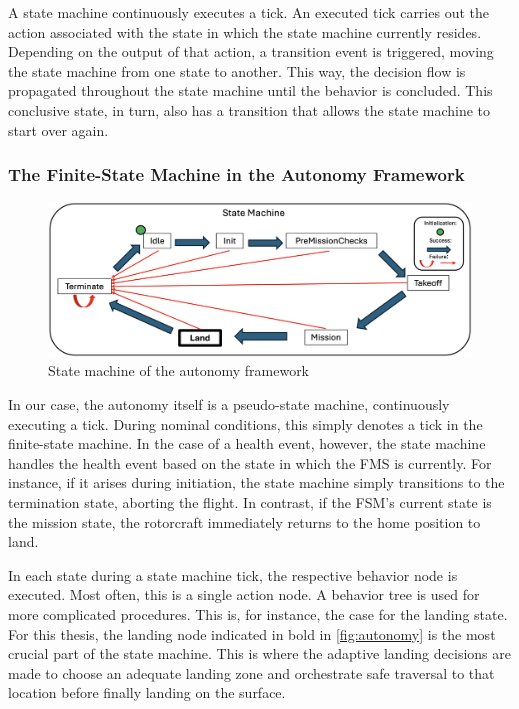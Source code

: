 \documentclass{article}
\begin{document}
A state machine continuously executes a tick. An executed tick carries out the action associated with the state in which the state machine currently resides. Depending on the output of that action, a transition event is triggered, moving the state machine from one state to another. This way, the decision flow is propagated throughout the state machine until the behavior is concluded. This conclusive state, in turn, also has a transition that allows the state machine to start over again.

\subsubsection{The Finite-State Machine in the Autonomy Framework}

\begin{figure}[ht!]
    \centering
    \includegraphics[scale=0.17]{images/system_overview/state_machine.png}
    \caption{State machine of the autonomy framework}
    \label{fig:state_machine}
\end{figure}

In our case, the autonomy itself is a pseudo-state machine, continuously executing a tick. During nominal conditions, this simply denotes a tick in the finite-state machine. In the case of a health event, however, the state machine handles the health event based on the state in which the FMS is currently. For instance, if it arises during initiation, the state machine simply transitions to the termination state, aborting the flight. In contrast, if the FSM's current state is the mission state, the rotorcraft immediately returns to the home position to land.

In each state during a state machine tick, the respective behavior node is executed. Most often, this is a single action node. A behavior tree is used for more complicated procedures. This is, for instance, the case for the landing state. For this thesis, the landing node indicated in bold in \cref{fig:autonomy} is the most crucial part of the state machine. This is where the adaptive landing decisions are made to choose an adequate landing zone and orchestrate safe traversal to that location before finally landing on the surface.
\end{document}
